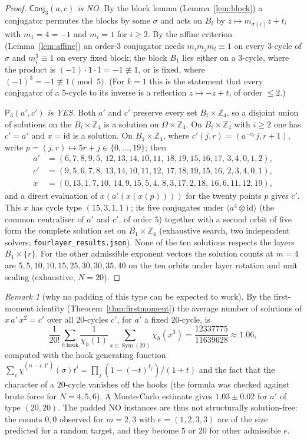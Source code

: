 \documentclass[preprint,12pt]{elsarticle}
\theoremstyle{definition}\newtheorem{defi}[thm]{Definition}\newtheorem{prob}[thm]{Problem}\newtheorem{obs}[thm]{Observation}
\theoremstyle{remark}\newtheorem{rem}[thm]{Remark}
\newcommand{\ZZ}{\mathbb Z}\newcommand{\Sym}{\operatorname{Sym}}\newcommand{\Alt}{\operatorname{Alt}}
\newcommand{\Pthree}{\mathsf{P}_3}\newcommand{\Conj}[1]{\mathsf{Conj}_{#1}}\newcommand{\Dzero}{\Conj{3}}\newcommand{\TR}{T_{\mathcal R}}
\begin{document}
\begin{proof}
\emph{$\Dzero(a,c)$ is NO.} By the block lemma (Lemma~\ref{lem:block}) a conjugator permutes the blocks by some $\sigma$ and acts on
$B_i$ by $z\mapsto m_{\sigma(i)}z+t_i$ with $m_1=4=-1$ and $m_i=1$ for $i\ge2$. By the affine criterion (Lemma~\ref{lem:affine}) an
order-$3$ conjugator needs $m_im_jm_l\equiv1$ on every $3$-cycle of $\sigma$ and $m_i^{3}\equiv1$ on every fixed block; the block $B_1$
lies either on a $3$-cycle, where the product is $(-1)\cdot1\cdot1=-1\not\equiv1$, or is fixed, where $(-1)^{3}=-1\not\equiv1\pmod5$.
(For $k=1$ this is the statement that every conjugator of a $5$-cycle to its inverse is a reflection $z\mapsto -z+t$, of order $\le2$.)

\emph{$\Pthree(a',c')$ is YES.} Both $a'$ and $c'$ preserve every set $B_i\times\ZZ_4$, so a disjoint union of solutions on the
$B_i\times\ZZ_4$ is a solution on $\Omega\times\ZZ_4$. On $B_i\times\ZZ_4$ with $i\ge2$ one has $c'=a'$ and $x=\mathrm{id}$ is a solution.
On $B_1\times\ZZ_4$, where $c'(j,r)=(a^{-e_r}j,r+1)$, write $p=(j,r)\mapsto 5r+j\in\{0,\dots,19\}$; then
\begin{align*}
a'&=(6,7,8,9,5,\,12,13,14,10,11,\,18,19,15,16,17,\,3,4,0,1,2),\\
c'&=(9,5,6,7,8,\,13,14,10,11,12,\,17,18,19,15,16,\,2,3,4,0,1),\\
x &=(0,13,1,7,10,\,14,9,15,5,4,\,8,3,17,2,18,\,16,6,11,12,19),
\end{align*}
and a direct evaluation of $x(a'(x(x(p))))$ for the twenty points $p$ gives $c'$. This $x$ has cycle type $(15,3,1,1)$; its five conjugates
under $\langle a^{4}\otimes\mathrm{id}\rangle$ (the common centraliser of $a'$ and $c'$, of order $5$) together with a second orbit of five form the complete
solution set on $B_1\times\ZZ_4$ (exhaustive search, two independent solvers; \texttt{fourlayer\_results.json}). None of the ten
solutions respects the layers $B_1\times\{r\}$. For the other admissible exponent vectors the solution counts at $m=4$ are
$5,5,10,10,15,25,30,30,35,40$ on the ten orbits under layer rotation and unit scaling (exhaustive, $N=20$).
\end{proof}

\begin{rem}[why no padding of this type can be expected to work]
By the first-moment identity (Theorem~\ref{thm:firstmoment}) the average number of solutions of $x\,a'\,x^{2}=c'$ over all $20$-cycles
$c'$, for $a'$ a fixed $20$-cycle, is
\[
\frac{1}{20!}\sum_{h\ \text{hook}}\frac{1}{\chi_h(1)}\sum_{x\in\Sym(20)}\chi_h(x^{3})=\frac{12337775}{11639628}\approx1.06,
\]
computed with the hook generating function $\sum_i\chi^{(n-i,1^i)}(\sigma)t^i=\prod_j(1-(-t)^{\ell_j})/(1+t)$ and the fact that the
character of a $20$-cycle vanishes off the hooks (the formula was checked against brute force for $N=4,5,6$). A Monte-Carlo estimate
gives $1.03\pm0.02$ for $a'$ of type $(20,20)$. The padded NO instances are thus not structurally solution-free: the counts $0,0$ observed
for $m=2,3$ with $e=(1,2,3,3)$ are of the size predicted for a random target, and they become $5$ or $20$ for other admissible $e$.
\end{rem}
\end{document}
